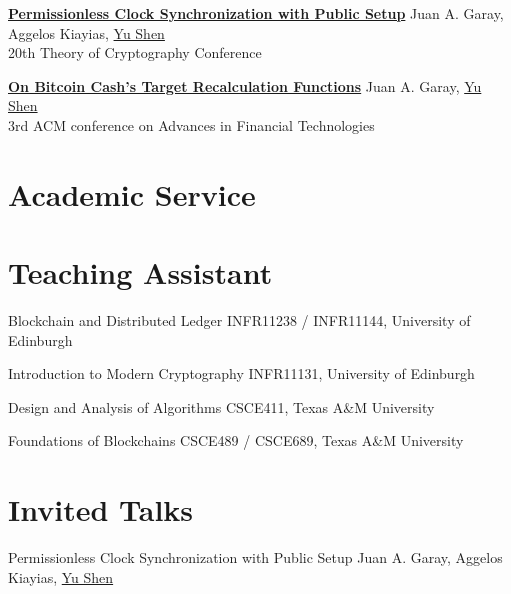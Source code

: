 \documentclass[11pt,a4paper,sans]{moderncv}
\begin{document}
{\textbf{\href{https://eprint.iacr.org/2022/1220.pdf}{Permissionless Clock Synchronization with Public Setup}}}
{}
{}
{}
{\normalsize Juan A. Garay, Aggelos Kiayias, \underline{Yu Shen} \\ 20th Theory of Cryptography Conference}

{\textbf{\href{https://eprint.iacr.org/2021/143.pdf}{On Bitcoin Cash's Target Recalculation Functions}}}
{}
{}
{}
{\normalsize Juan A. Garay, \underline{Yu Shen} \\ 3rd ACM conference on Advances in Financial Technologies}

\section{Academic Service}


\section{Teaching Assistant}

{Blockchain and Distributed Ledger}
{}
{}
{}
{INFR11238 / INFR11144, University of Edinburgh}

{Introduction to Modern Cryptography}
{}
{}
{}
{INFR11131, University of Edinburgh}

{Design and Analysis of Algorithms}
{}
{}
{}
{CSCE411, Texas A\&M University}

{Foundations of Blockchains}
{}
{}
{}
{CSCE489 / CSCE689, Texas A\&M University
}

\section{Invited Talks}

{Permissionless Clock Synchronization with Public Setup}
{}
{}
{}
{\normalsize Juan A. Garay, Aggelos Kiayias, \underline{Yu Shen}}
\end{document}
